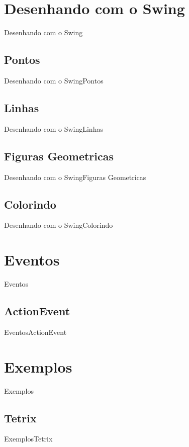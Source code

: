 \documentclass[10pt]{beamer}
\begin{document}
\section{Desenhando com o Swing}
\begin{frame}{Desenhando com o Swing}{}
\end{frame}{}
\subsection{Pontos}
\begin{frame}{Desenhando com o Swing}{Pontos}
\end{frame}{}
\subsection{Linhas}
\begin{frame}{Desenhando com o Swing}{Linhas}
\end{frame}{}
\subsection{Figuras Geometricas}
\begin{frame}{Desenhando com o Swing}{Figuras Geometricas}
\end{frame}{}
\subsection{Colorindo}
\begin{frame}{Desenhando com o Swing}{Colorindo}
\end{frame}{}
\section{Eventos}
\begin{frame}{Eventos}{}
\end{frame}{}
\subsection{ActionEvent}
\begin{frame}{Eventos}{ActionEvent}
\end{frame}{}
\section{Exemplos}
\begin{frame}{Exemplos}{}
\end{frame}{}
\subsection{Tetrix}
\begin{frame}{Exemplos}{Tetrix}
\end{frame}{}
\end{document}
